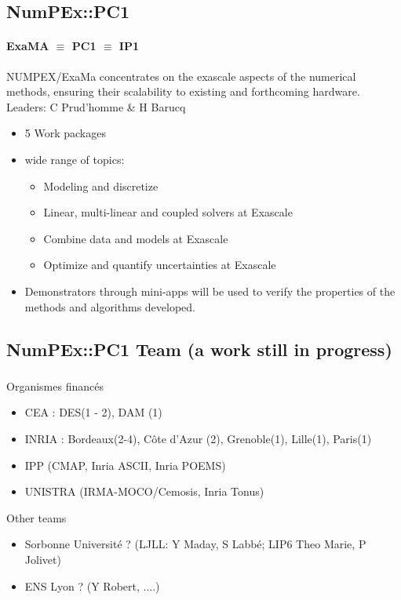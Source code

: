 \subsection{NumPEx::PC1}
\begin{frame}{\insertsectionhead}
  \framesubtitle{ExaMA $\equiv$ PC1 $\equiv$ IP1}
  NUMPEX/ExaMa concentrates on the exascale aspects of the numerical methods, ensuring their scalability to existing and forthcoming hardware.
  \vfill
  Leaders: C Prud'homme \& H Barucq
  \begin{itemize}
    \item 5 Work packages
    \item wide range of topics: 
    \begin{itemize}
        \item Modeling and discretize
        \item Linear, multi-linear and coupled solvers at Exascale
        \item Combine data and  models at Exascale
        \item Optimize and quantify uncertainties at Exascale
    \end{itemize}
    \item Demonstrators through mini-apps will be used to verify the properties of the methods and algorithms developed.
  \end{itemize}
\end{frame}

\subsection{NumPEx::PC1 Team (a work still in progress)}

\begin{frame}
  \frametitle{\insertsectionhead}
  \framesubtitle{\insertsubsectionhead}

  Organismes financés
  \begin{itemize}
    \item CEA : DES(1 - 2), DAM (1)
    \item INRIA : Bordeaux(2-4),  Côte d'Azur (2), Grenoble(1), Lille(1), Paris(1)
    \item IPP (CMAP, Inria ASCII, Inria POEMS)
    \item UNISTRA  (IRMA-MOCO/Cemosis, Inria Tonus)
  \end{itemize}

  \begin{alertblock}{Other teams}
    \begin{itemize}
      \item Sorbonne Université ? (LJLL: Y  Maday, S Labbé; LIP6 Theo Marie, P Jolivet)
      \item ENS Lyon ? (Y Robert, ....) 
    \end{itemize}
  \end{alertblock}
\end{frame}

